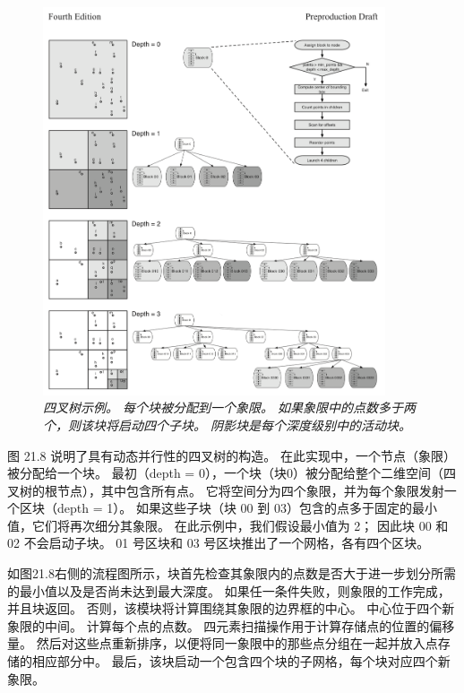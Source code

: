 \begin{figure}[H]
	\centering
	\includegraphics[width=0.9\textwidth]{figs/F21.8.png}
	\caption{\textit{四叉树示例。 每个块被分配到一个象限。 如果象限中的点数多于两个，则该块将启动四个子块。 
	阴影块是每个深度级别中的活动块。}}
\end{figure}

图 21.8 说明了具有动态并行性的四叉树的构造。 在此实现中，一个节点（象限）被分配给一个块。 
最初（depth = 0），一个块（块0）被分配给整个二维空间（四叉树的根节点），其中包含所有点。 
它将空间分为四个象限，并为每个象限发射一个区块（depth = 1）。 
如果这些子块（块 00 到 03）包含的点多于固定的最小值，它们将再次细分其象限。 
在此示例中，我们假设最小值为 2； 因此块 00 和 02 不会启动子块。 01 号区块和 03 号区块推出了一个网格，各有四个区块。

如图21.8右侧的流程图所示，块首先检查其象限内的点数是否大于进一步划分所需的最小值以及是否尚未达到最大深度。 
如果任一条件失败，则象限的工作完成，并且块返回。 否则，该模块将计算围绕其象限的边界框的中心。 中心位于四个新象限的中间。 
计算每个点的点数。 四元素扫描操作用于计算存储点的位置的偏移量。 
然后对这些点重新排序，以便将同一象限中的那些点分组在一起并放入点存储的相应部分中。 
最后，该块启动一个包含四个块的子网格，每个块对应四个新象限。

